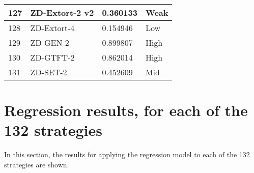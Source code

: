 \begin{longtable}{|p{0.5cm}||p{6cm}||p{4cm}||p{2cm}|}
			127 & ZD-Extort-2 v2              & 0.360133          & Weak     \\ \hline
			128 & ZD-Extort-4                 & 0.154946          & Low      \\ \hline
			129 & ZD-GEN-2                    & 0.899807          & High     \\ \hline
			130 & ZD-GTFT-2                   & 0.862014          & High     \\ \hline
			131 & ZD-SET-2                    & 0.452609          & Mid     \\ \hline
		\end{longtable}

\section{Regression results, for each of the 132 strategies}
\label{append:reg-results-strategies}
In this section, the results for applying the regression model to each of the
132 strategies are shown.

